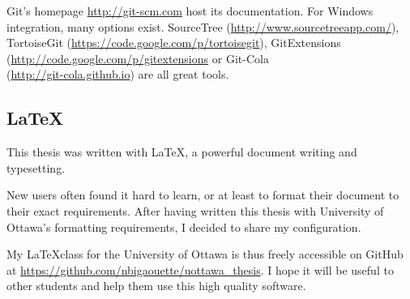 Git's homepage \url{http://git-scm.com} host its documentation. For Windows
integration, many options exist.
SourceTree (\url{http://www.sourcetreeapp.com/}),
TortoiseGit (\url{https://code.google.com/p/tortoisegit}),
GitExtensions (\url{http://code.google.com/p/gitextensions}
or Git-Cola \\
(\url{http://git-cola.github.io}) are all great tools.


\subsection*{\LaTeX}

This thesis was written with \LaTeX, a powerful document writing and typesetting.

New users often found it hard to learn, or at least to format their document
to their exact requirements. After having written this thesis with University of
Ottawa's formatting requirements, I decided to share my configuration.

My \LaTeX class for the University of Ottawa is thus freely accessible on
GitHub at \url{https://github.com/nbigaouette/uottawa_thesis}. I hope it will
be useful to other students and help them use this high quality software.



